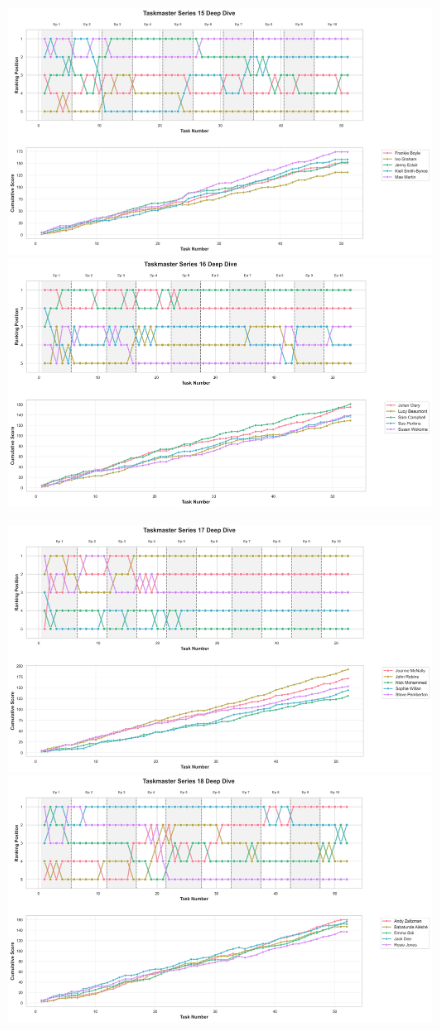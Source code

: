 \documentclass[10pt,letterpaper]{article}
\begin{document}
\begin{figure}[!h]
\centering
\includegraphics[width=\linewidth]{figures/supplementary/series_15_deep_dive.png}
\includegraphics[width=\linewidth]{figures/supplementary/series_16_deep_dive.png}
\end{figure}
\FloatBarrier
\clearpage

\begin{figure}[!h]
\centering
\includegraphics[width=\linewidth]{figures/supplementary/series_17_deep_dive.png}
\includegraphics[width=\linewidth]{figures/supplementary/series_18_deep_dive.png}
\end{figure}
\FloatBarrier
\clearpage
\end{document}
